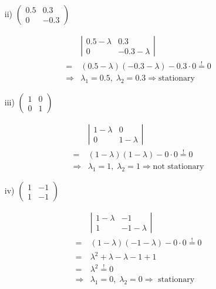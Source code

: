 \documentclass[12pt,a4paper]{article}
\begin{document}
\begin{itemize} 
    \item[ii)] $ \begin{pmatrix}
    0.5 & 0.3 \\ 
    0 & -0.3
    \end{pmatrix} $
\end{itemize}

\begin{align*}
  & \left|
  \begin{matrix}
    0.5 - \lambda & 0.3 \\ 
    0 &  -0.3 - \lambda
    \end{matrix}
    \right| \\
    = & (0.5 - \lambda)(-0.3 - \lambda) - 0.3 \cdot 0 \overset{!}{=} 0 \\
    \Rightarrow & \lambda_1 = 0.5, \; \lambda_2 = 0.3 \Rightarrow \text{stationary} 
\end{align*}

\begin{itemize}     
        \item[iii)] $ \begin{pmatrix}
    1 & 0 \\ 
    0 & 1
    \end{pmatrix} $
\end{itemize}

\begin{align*}
  & \left|
  \begin{matrix}
    1 - \lambda & 0 \\ 
    0 &  1 - \lambda
    \end{matrix}
    \right| \\
    = & (1 - \lambda)(1 - \lambda) - 0 \cdot 0 \overset{!}{=} 0 \\
    \Rightarrow & \lambda_1 = 1, \; \lambda_2 = 1 \Rightarrow \text{not stationary} 
\end{align*}

\begin{itemize}
    \item[iv)] $ \begin{pmatrix}
    1 & -1 \\ 
    1 & -1
    \end{pmatrix} $
\end{itemize}

\begin{align*}
  & \left|
  \begin{matrix}
    1 - \lambda & -1 \\ 
    1 &  -1 - \lambda
    \end{matrix}
    \right| \\
    = & (1 - \lambda)(-1 - \lambda) - 0 \cdot 0 \overset{!}{=} 0 \\
    = & \lambda^2 + \lambda - \lambda - 1 +1 \\
    = & \lambda^2 \overset{!}{=} 0\\
    \Rightarrow & \lambda_1 = 0, \; \lambda_2 = 0 \Rightarrow \text{ stationary} 
\end{align*}
\end{document}
